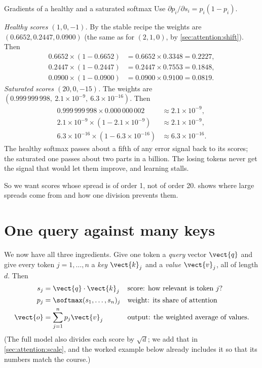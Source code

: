 \begin{worked}[label={we:attention:satgrad}]{Gradients of a healthy and a saturated softmax}
Use $\partial p_i/\partial s_i = p_i(1-p_i)$.

\emph{Healthy scores $(1, 0, -1)$.} By the stable recipe the weights are $(0.6652, 0.2447,
0.0900)$ (the same as for $(2,1,0)$, by \cref{sec:attention:shift}). Then
\begin{align*}
  0.6652\times(1 - 0.6652) &= 0.6652\times0.3348 = 0.2227,\\
  0.2447\times(1 - 0.2447) &= 0.2447\times0.7553 = 0.1848,\\
  0.0900\times(1 - 0.0900) &= 0.0900\times0.9100 = 0.0819.
\end{align*}
\emph{Saturated scores $(20, 0, -15)$.} The weights are $(0.999\,999\,998,\ 2.1\times10^{-9},\
6.3\times10^{-16})$. Then
\begin{align*}
  0.999\,999\,998\times 0.000\,000\,002 &\approx 2.1\times10^{-9},\\
  2.1\times10^{-9}\times(1 - 2.1\times10^{-9}) &\approx 2.1\times10^{-9},\\
  6.3\times10^{-16}\times(1 - 6.3\times10^{-16}) &\approx 6.3\times10^{-16}.
\end{align*}
The healthy softmax passes about a fifth of any error signal back to its scores; the saturated
one passes about two parts in a billion. The losing tokens never get the signal that would let
them improve, and learning stalls.
\end{worked}

So we want scores whose spread is of order 1, not of order 20.  shows
where large spreads come from and how one division prevents them.

\section{One query against many keys}\label{sec:attention:onequery}

We now have all three ingredients. Give one token a \emph{query} vector $\vect{q}$ and give every
token $j = 1,\dots,n$ a \emph{key} $\vect{k}_j$ and a \emph{value} $\vect{v}_j$, all of length
$d$. Then
\begin{align}
  s_j &= \vect{q}\cdot\vect{k}_j && \text{score: how relevant is token } j\text{?} \label{eq:attention:s}\\
  p_j &= \softmax(s_1,\dots,s_n)_j && \text{weight: its share of attention} \label{eq:attention:p}\\
  \vect{o} &= \sum_{j=1}^{n} p_j \vect{v}_j && \text{output: the weighted average of values.} \label{eq:attention:o}
\end{align}
(The full model also divides each score by $\sqrt{d}$; we add that in
\cref{sec:attention:scale}, and the worked example below already includes it so that its numbers
match the course.)

